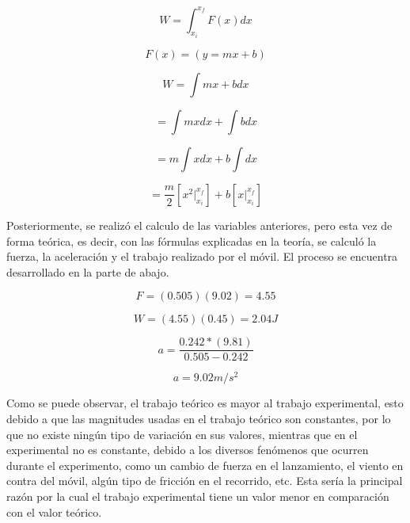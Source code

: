 \documentclass{article}
\begin{document}
\begin{equation*}
	W = \int_{x_i}^{x_f} F(x) dx
\end{equation*}

\begin{equation*}
	F(x) = (y = mx + b)
\end{equation*}

\begin{equation*}
	W = \int mx + b dx
\end{equation*}

\begin{equation*}
	= \int mx dx + \int b dx
\end{equation*}

\begin{equation*}
	= m \int x dx + b \int dx
\end{equation*}

\begin{equation*}
	= \frac{m}{2} [x^2 \Big|_{x_i}^{x_f}] + b[x \Big|_{x_i}^{x_f}]
\end{equation*}




Posteriormente, se realizó el calculo de las variables anteriores, pero esta vez de forma teórica, es decir, con las fórmulas explicadas en la teoría, se calculó la fuerza, la aceleración y el trabajo realizado por el móvil. El proceso se encuentra desarrollado en la parte de abajo.

\begin{equation*}
	F = (0.505)(9.02) = 4.55
\end{equation*}

\begin{equation*}
	W = (4.55)(0.45) = 2.04J
\end{equation*}

\begin{equation*}
	a = \frac{0.242 * (9.81)}{0.505 - 0.242}
\end{equation*}

\begin{equation*}
	a = 9.02 m/s^2
\end{equation*}


Como se puede observar, el trabajo teórico es mayor al trabajo experimental, esto debido a que las magnitudes usadas en el trabajo teórico son constantes, por lo que no existe ningún tipo de variación en sus valores, mientras que en el experimental no es constante, debido a los diversos fenómenos que ocurren durante el experimento, como un cambio de fuerza en el lanzamiento, el viento en contra del móvil, algún tipo de fricción en el recorrido, etc. Esta sería la principal razón por la cual el trabajo experimental tiene un valor menor en comparación con el valor teórico.
\end{document}
